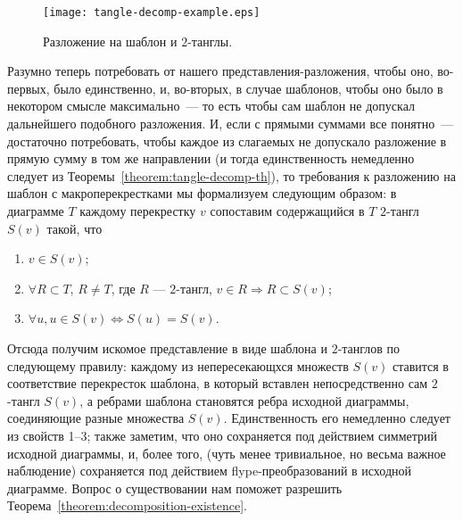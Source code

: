 \documentclass[12pt]{article}
\theoremstyle{plain}
\theoremstyle{definition}
\begin{document}
		\begin{figure}[ht]
			\centering
			\texttt{[image: tangle-decomp-example.eps]}
			\caption{\footnotesize Разложение на шаблон и $2$-танглы.\label{figure:template-tangles-decomposition}}
		\end{figure}

		Разумно теперь потребовать от нашего представления-разложения, чтобы оно, во-первых, было единственно, и, во-вторых, в случае
		шаблонов, чтобы оно было в некотором смысле максимально~--- то есть чтобы сам шаблон не допускал дальнейшего подобного разложения.
		И, если с прямыми суммами все понятно~--- достаточно потребовать, чтобы каждое из слагаемых не допускало разложение в прямую сумму
		в том же направлении (и тогда единственность немедленно следует из Теоремы~\ref{theorem:tangle-decomp-th}), то требования к
		разложению на шаблон с макроперекрестками мы формализуем следующим образом: в диаграмме $T$ каждому перекрестку $v$ сопоставим
		содержащийся в $T$ $2$-тангл $S(v)$ такой, что
		\begin{enumerate}
			\item
			$v \in S(v)$;

			\item
			$\forall R \subset T$, $R \ne T$, где $R$ --- $2$-тангл, $v \in R \Rightarrow R \subset S(v)$;

			\item
			$\forall u, u \in S(v) \Leftrightarrow S(u) = S(v)$.
		\end{enumerate}
		Отсюда получим искомое представление в виде шаблона и $2$-танглов по следующему правилу: каждому из непересекающхся множеств $S(v)$
		ставится в соответствие перекресток шаблона, в который вставлен непосредственно сам $2$-тангл $S(v)$, а ребрами шаблона становятся
		ребра исходной диаграммы, соединяющие разные множества $S(v)$. Единственность его немедленно следует из свойств 1--3; также заметим,
		что оно сохраняется под действием симметрий исходной диаграммы, и, более того, (чуть менее тривиальное, но весьма важное наблюдение)
		сохраняется под действием flype-преобразований в исходной диаграмме. Вопрос о существовании нам поможет разрешить
		Теорема~\ref{theorem:decomposition-existence}.
\end{document}
